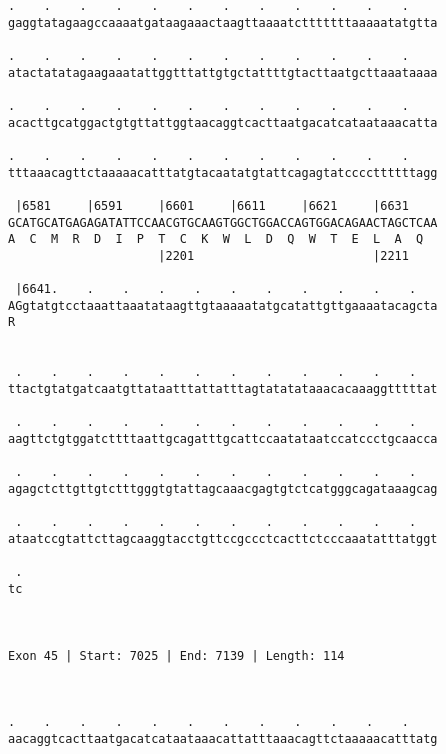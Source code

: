 \documentclass{article}
\begin{document}
\begin{Verbatim}
.    .    .    .    .    .    .    .    .    .    .    .    
gaggtatagaagccaaaatgataagaaactaagttaaaatctttttttaaaaatatgtta
                                                            
.    .    .    .    .    .    .    .    .    .    .    .    
atactatatagaagaaatattggtttattgtgctattttgtacttaatgcttaaataaaa
                                                            
.    .    .    .    .    .    .    .    .    .    .    .    
acacttgcatggactgtgttattggtaacaggtcacttaatgacatcataataaacatta
                                                            
.    .    .    .    .    .    .    .    .    .    .    .    
tttaaacagttctaaaaacatttatgtacaatatgtattcagagtatccccttttttagg
                                                            
 |6581     |6591     |6601     |6611     |6621     |6631    
GCATGCATGAGAGATATTCCAACGTGCAAGTGGCTGGACCAGTGGACAGAACTAGCTCAA
A  C  M  R  D  I  P  T  C  K  W  L  D  Q  W  T  E  L  A  Q  
                     |2201                         |2211    
  
 |6641.    .    .    .    .    .    .    .    .    .    .   
AGgtatgtcctaaattaaatataagttgtaaaaatatgcatattgttgaaaatacagcta
R                                                           
                                                            
  
 .    .    .    .    .    .    .    .    .    .    .    .   
ttactgtatgatcaatgttataatttattatttagtatatataaacacaaaggtttttat
                                                            
 .    .    .    .    .    .    .    .    .    .    .    .   
aagttctgtggatcttttaattgcagatttgcattccaatataatccatccctgcaacca
                                                            
 .    .    .    .    .    .    .    .    .    .    .    .   
agagctcttgttgtctttgggtgtattagcaaacgagtgtctcatgggcagataaagcag
                                                            
 .    .    .    .    .    .    .    .    .    .    .    .   
ataatccgtattcttagcaaggtacctgttccgccctcacttctcccaaatatttatggt
                                                            
 .
tc
  
  
 
Exon 45 | Start: 7025 | End: 7139 | Length: 114



.    .    .    .    .    .    .    .    .    .    .    .    
aacaggtcacttaatgacatcataataaacattatttaaacagttctaaaaacatttatg
                                                            

\end{Verbatim}
\end{document}
